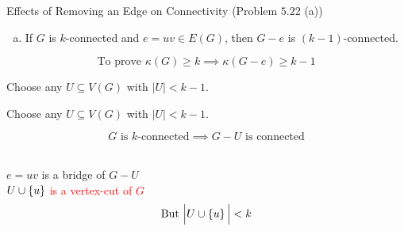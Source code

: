 
\begin{frame}{}
  \begin{exampleblock}{Effects of Removing an Edge on Connectivity (Problem $5.22$\; (a))}
    \begin{enumerate}[(a)]
      \item If $G$ is $k$-connected and $e = uv \in E(G)$, then $G - e$ is $(k-1)$-connected.
    \end{enumerate}
  \end{exampleblock}

  \pause
  \[
    \text{To prove } \kappa(G) \ge k \implies \kappa(G - e) \ge k-1
  \]

  \pause
  \vspace{0.50cm}
  \begin{center}
    Choose any $U \subseteq V(G)$ with $|U| < k - 1$. \\[6pt]
  \end{center}
\end{frame}

\begin{frame}{}
  \begin{center}
    Choose any $U \subseteq V(G)$ with $|U| < k - 1$. \\[6pt]
  \end{center}

  \pause
  \[
    G \text{ is } k\text{-connected} \implies G - U \text{ is connected}
  \]

  \pause
  \begin{center}
     \\[8pt] \pause
    $e = uv$ is a bridge of $G - U$ \\[8pt] \pause
    \textcolor<8>{red}{$U \cup \left\{u\right\}$ is a vertex-cut of $G$} \pause
    \[
      \text{But } \Big\lvert U \cup \left\{u\right\} \Big \rvert < k
    \]
  \end{center}

\end{frame}

